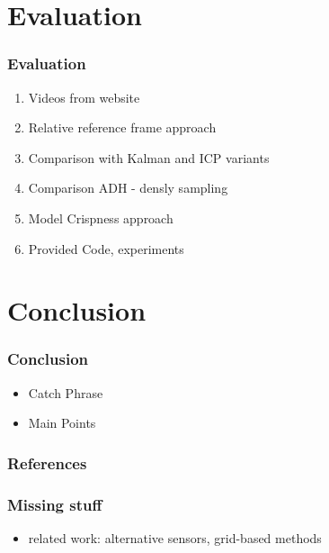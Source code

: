 \section{Evaluation}
\begin{frame}
  \frametitle{Evaluation}
  \begin{enumerate}
  \item Videos from website
  \item Relative reference frame approach
  \item Comparison with Kalman and ICP variants
  \item Comparison ADH - densly sampling
  \item Model Crispness approach
  \item Provided Code, experiments
  \end{enumerate}
\end{frame}

\section{Conclusion}
\begin{frame}
  \frametitle{Conclusion}
  \begin{itemize}
  \item Catch Phrase
  \item Main Points
  \end{itemize}
\end{frame}



\backupbegin

\begin{frame}[allowframebreaks]
  \frametitle{References}
  \nocite{*}
  
  
\end{frame}

\begin{frame}
  \frametitle{Missing stuff}
  \begin{itemize}
  \item related work: alternative sensors, grid-based methods
  \end{itemize}
\end{frame}

\backupend


